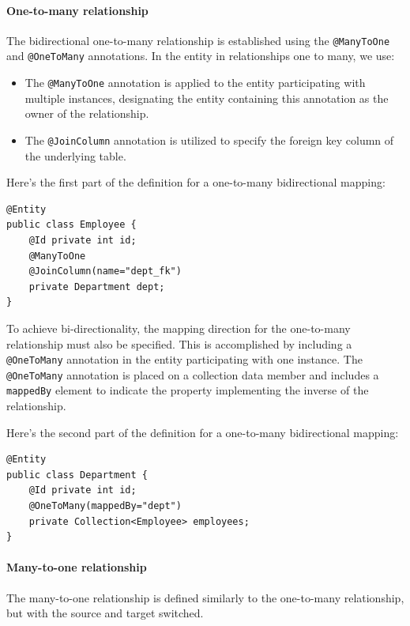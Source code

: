 \paragraph*{One-to-many relationship}
The bidirectional one-to-many relationship is established using the \texttt{@ManyToOne} and \texttt{@OneToMany} annotations. 
In the entity in relationships one to many, we use:
\begin{itemize}
    \item The \texttt{@ManyToOne} annotation is applied to the entity participating with multiple instances, designating the entity containing this annotation as the owner of the relationship.
    \item The \texttt{@JoinColumn} annotation is utilized to specify the foreign key column of the underlying table.
\end{itemize}
\begin{example}
    Here's the first part of the definition for a one-to-many bidirectional mapping:
\begin{lstlisting}[style=Java]
@Entity
public class Employee {
    @Id private int id;
    @ManyToOne
    @JoinColumn(name="dept_fk")
    private Department dept;
}
\end{lstlisting}
\end{example}
To achieve bi-directionality, the mapping direction for the one-to-many relationship must also be specified. 
This is accomplished by including a \texttt{@OneToMany} annotation in the entity participating with one instance. 
The \texttt{@OneToMany} annotation is placed on a collection data member and includes a \texttt{mappedBy} element to indicate the property implementing the inverse of the relationship.
\begin{example}
    Here's the second part of the definition for a one-to-many bidirectional mapping:
\begin{lstlisting}[style=Java]
@Entity
public class Department {
    @Id private int id;
    @OneToMany(mappedBy="dept")
    private Collection<Employee> employees;
}
\end{lstlisting}
\end{example}

\paragraph*{Many-to-one relationship}
The many-to-one relationship is defined similarly to the one-to-many relationship, but with the source and target switched.

